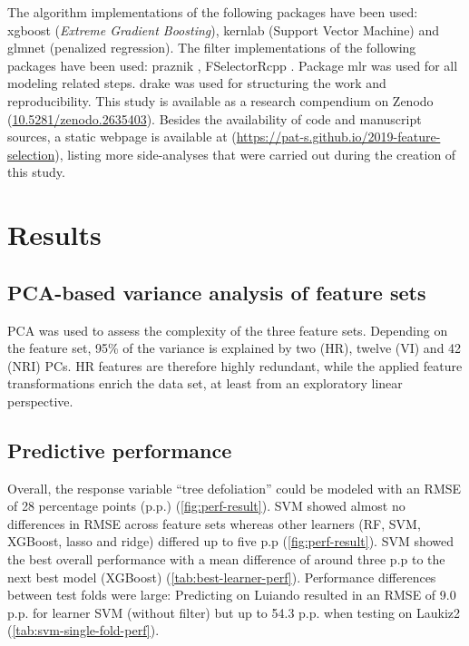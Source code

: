 \documentclass[remotesensing,article,submit,moreauthors,pdftex]{Definitions/mdpi}
\begin{document}
The algorithm implementations of the following packages have been used: xgboost \cite{chen2016} (\textit{Extreme Gradient Boosting}), kernlab \cite{kernlab} (Support Vector Machine) and glmnet \cite{glmnet} (penalized regression).
The filter implementations of the following packages have been used: praznik \cite{praznik}, FSelectorRcpp \cite{fselectorrcpp}.
Package mlr \cite{mlr} was used for all modeling related steps.
drake \cite{drake} was used for structuring the work and reproducibility.
This study is available as a research compendium on Zenodo (\url{10.5281/zenodo.2635403}).
Besides the availability of code and manuscript sources, a static webpage is available at (\url{https://pat-s.github.io/2019-feature-selection}), listing more side-analyses that were carried out during the creation of this study.

\section{Results}

\subsection{PCA-based variance analysis of feature sets}

PCA was used to assess the complexity of the three feature sets.
Depending on the feature set, 95\% of the variance is explained by two (HR), twelve (VI) and 42 (NRI) \ac{PC}s.
HR features are therefore highly redundant, while the applied feature transformations enrich the data set, at least from an exploratory linear perspective.

\subsection{Predictive performance}

Overall, the response variable \enquote{tree defoliation} could be modeled with an \ac{RMSE} of 28 percentage points (p.p.) (\autoref{fig:perf-result}).
SVM showed almost no differences in RMSE across feature sets whereas other learners (RF, SVM, XGBoost, lasso and ridge) differed up to five p.p (\autoref{fig:perf-result}).
SVM showed the best overall performance with a mean difference of around three p.p to the next best model (XGBoost) (\autoref{tab:best-learner-perf}).
Performance differences between test folds were large: Predicting on Luiando resulted in an RMSE of 9.0 p.p. for learner SVM (without filter) but up to 54.3 p.p. when testing on Laukiz2 (\autoref{tab:svm-single-fold-perf}).
\end{document}
